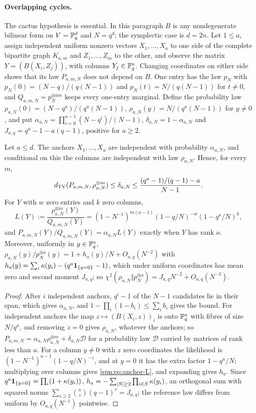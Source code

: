 \paragraph{Overlapping cycles.}
The cactus hypothesis is essential. In this paragraph $B$ is any nondegenerate bilinear form on
$V=\mathbb{F}_q^d$ and $N=q^d$; the symplectic case is $d=2n$. Let $1\le a$, assign independent uniform nonzero
vectors $X_1,\dots,X_a$ to one side of the complete bipartite graph $K_{a,m}$ and $Z_1,\dots,Z_m$ to the
other, and observe the matrix $Y=(B(X_i,Z_j))$, with columns $Y_j\in\mathbb{F}_q^a$. Changing coordinates on
either side shows that its law $P_{a,m,N}$ does not depend on $B$. One entry has the law $p_N$ with
$p_N(0)=(N-q)/(q(N-1))$ and $p_N(t)=N/(q(N-1))$ for $t\ne0$, and $Q_{a,m,N}=p_N^{\otimes am}$ keeps every
one-entry marginal. Define the probability law $\rho_{a,N}(0)=(N-q^a)/(q^a(N-1))$,
$\rho_{a,N}(y)=N/(q^a(N-1))$ for $y\ne0$, and put $\alpha_{a,N}=\prod_{i=0}^{a-1}(N-q^i)/(N-1)$,
$\delta_{a,N}=1-\alpha_{a,N}$ and $J_{a,q}=q^a-1-a(q-1)$, positive for $a\ge2$.

\begin{proposition}\label{spn:prop:anchors}
Let $a\le d$. The anchors $X_1,\dots,X_a$ are independent with probability $\alpha_{a,N}$, and
conditional on this the columns are independent with law $\rho_{a,N}$. Hence, for every $m$,
\[
 d_{\mathrm{TV}}(P_{a,m,N},\rho_{a,N}^{\otimes m})\le\delta_{a,N}\le\frac{(q^a-1)/(q-1)-a}{N-1}.
\]
For $Y$ with $w$ zero entries and $k$ zero columns,
\begin{equation}\label{spn:eq:anchor-L}
 L(Y):=\frac{\rho_{a,N}^{\otimes m}(Y)}{Q_{a,m,N}(Y)}=(1-N^{-1})^{m(a-1)}(1-q/N)^{-w}(1-q^a/N)^k,
\end{equation}
and $P_{a,m,N}(Y)/Q_{a,m,N}(Y)=\alpha_{a,N}L(Y)$ exactly when $Y$ has rank $a$. Moreover, uniformly in
$y\in\mathbb{F}_q^a$, $\rho_{a,N}(y)/p_N^{\otimes a}(y)=1+h_a(y)/N+O_{a,q}(N^{-2})$ with
$h_a(y)=\sum_i\kappa(y_i)-(q^a\mathbf 1_{\{y=0\}}-1)$, which under uniform coordinates has mean zero and
second moment $J_{a,q}$; so $\chi^2(\rho_{a,N}\Vert p_N^{\otimes a})=J_{a,q}N^{-2}+O_{a,q}(N^{-3})$.
\end{proposition}

\begin{proof}
After $i$ independent anchors, $q^i-1$ of the $N-1$ candidates lie in their span, which gives
$\alpha_{a,N}$, and $1-\prod_i(1-b_i)\le\sum_ib_i$ gives the bound. For independent anchors the map
$z\mapsto(B(X_i,z))_i$ is onto $\mathbb{F}_q^a$ with fibres of size $N/q^a$, and removing $z=0$
gives $\rho_{a,N}$, whatever the anchors; so
$P_{a,m,N}=\alpha_{a,N}\rho_{a,N}^{\otimes m}+\delta_{a,N}\mathcal D$ for a probability law $\mathcal D$
carried by matrices of rank less than $a$. For a column $y\ne0$ with $z$ zero coordinates the likelihood
is $(1-N^{-1})^{a-1}(1-q/N)^{-z}$, and at $y=0$ it has the extra factor $1-q^a/N$; multiplying over
columns gives \eqref{spn:eq:anchor-L}, and expanding gives $h_a$. Since
$q^a\mathbf 1_{\{y=0\}}=\prod_i(1+\kappa(y_i))$, $h_a=-\sum_{\lvert S\rvert\ge2}\prod_{i\in S}\kappa(y_i)$, an
orthogonal sum with squared norms $\sum_{s\ge2}\binom as(q-1)^s=J_{a,q}$; the reference law differs
from uniform by $O_{a,q}(N^{-1})$ pointwise.
\end{proof}

